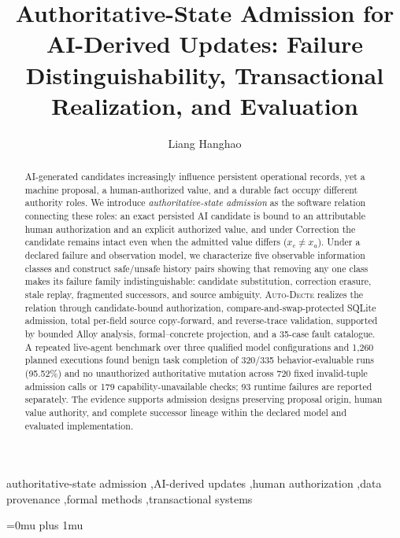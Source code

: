 \documentclass[preprint,12pt,authoryear]{elsarticle}
\newcommand{\system}{\textsc{Auto-Decte}}
\begin{document}
\begin{frontmatter}

\title{Authoritative-State Admission for AI-Derived Updates: Failure Distinguishability, Transactional Realization, and Evaluation}

\author[inst1]{Liang Hanghao}

\begin{abstract}
AI-generated candidates increasingly influence persistent operational records, yet a machine proposal, a human-authorized value, and a durable fact occupy different authority roles. We introduce \emph{authoritative-state admission} as the software relation connecting these roles: an exact persisted AI candidate is bound to an attributable human authorization and an explicit authorized value, and under Correction the candidate remains intact even when the admitted value differs ($x_c\neq x_a$). Under a declared failure and observation model, we characterize five observable information classes and construct safe/unsafe history pairs showing that removing any one class makes its failure family indistinguishable: candidate substitution, correction erasure, stale replay, fragmented successors, and source ambiguity. \system{} realizes the relation through candidate-bound authorization, compare-and-swap-protected SQLite admission, total per-field source copy-forward, and reverse-trace validation, supported by bounded Alloy analysis, formal--concrete projection, and a 35-case fault catalogue. A repeated live-agent benchmark over three qualified model configurations and 1,260 planned executions found benign task completion of 320/335 behavior-evaluable runs (95.52\%) and no unauthorized authoritative mutation across 720 fixed invalid-tuple admission calls or 179 capability-unavailable checks; 93 runtime failures are reported separately. The evidence supports admission designs preserving proposal origin, human value authority, and complete successor lineage within the declared model and evaluated implementation.
\end{abstract}

\begin{keyword}
authoritative-state admission \sep AI-derived updates \sep human authorization \sep data provenance \sep formal methods \sep transactional systems
\end{keyword}

\end{frontmatter}















\begingroup
\Urlmuskip=0mu plus 1mu\relax

\endgroup
\end{document}
